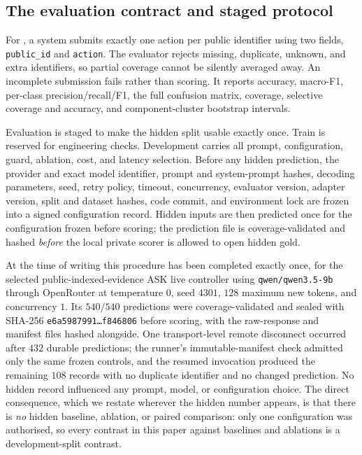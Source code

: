 \subsection{The \mgpc{} evaluation contract and staged protocol}
\label{sec:v43contract}

For \mgpc{}, a system submits exactly one action per public identifier using two
fields, \texttt{public\_id} and \texttt{action}. The evaluator rejects missing,
duplicate, unknown, and extra identifiers, so partial coverage cannot be
silently averaged away. An incomplete submission fails rather than scoring.
It reports accuracy, macro-F1, per-class precision/recall/F1, the full confusion
matrix, coverage, selective coverage and accuracy, and component-cluster
bootstrap intervals.

Evaluation is staged to make the hidden split usable exactly once.
Train is reserved for engineering checks. Development carries all prompt,
configuration, guard, ablation, cost, and latency selection. Before any hidden
prediction, the provider and exact model identifier, prompt and system-prompt
hashes, decoding parameters, seed, retry policy, timeout, concurrency,
evaluator version, adapter version, split and dataset hashes, code commit, and
environment lock are frozen into a signed configuration record. Hidden inputs
are then predicted once for the configuration frozen before scoring; the prediction file is
coverage-validated and hashed \emph{before} the local private scorer is allowed
to open hidden gold.

At the time of writing this procedure has been completed exactly once, for the
selected public-indexed-evidence ASK live controller using
\texttt{qwen/qwen3.5-9b} through OpenRouter at temperature $0$, seed $4301$,
$128$ maximum new tokens, and concurrency $1$. Its $540/540$ predictions were
coverage-validated and sealed with SHA-256
\texttt{e6a5987991\dots f846806} before scoring, with the raw-response and
manifest files hashed alongside. One transport-level remote disconnect occurred
after $432$ durable predictions; the runner's immutable-manifest check admitted
only the same frozen controls, and the resumed invocation produced the remaining
$108$ records with no duplicate identifier and no changed prediction. No hidden
record influenced any prompt, model, or configuration choice. The direct
consequence, which we restate wherever the hidden number appears, is that there
is \emph{no} hidden baseline, ablation, or paired comparison: only one
configuration was authorised, so every contrast in this paper against baselines
and ablations is a development-split contrast.

